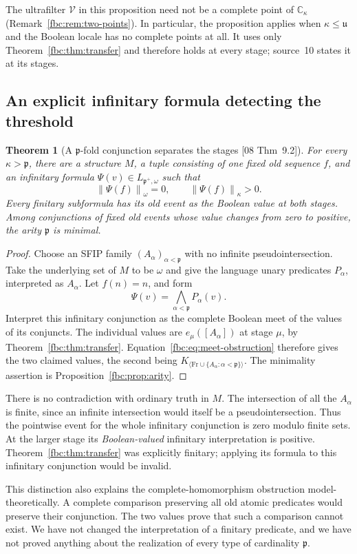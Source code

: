 \documentclass[11pt,letterpaper]{article}
\newtheorem{theorem}{Theorem}[section]
\theoremstyle{definition}
\theoremstyle{remark}
\newcommand{\om}{\omega}
\newcommand{\Fr}{\mathrm{Fr}}
\newcommand{\C}{\mathbb C}
\newcommand{\cp}{\mathfrak p}
\newcommand{\cu}{\mathfrak u}
\newcommand{\gen}[1]{\langle #1\rangle}
\newcommand{\cV}{\mathcal V}
\newcommand{\truth}[1]{\left\lVert #1\right\rVert}
\newcommand{\src}[1]{\textup{[#1]}}
\begin{document}
The ultrafilter $\cV$ in this proposition need not be a complete point of
$\C_\kappa$ (Remark~\ref{fbc:rem:two-points}). In particular, the
proposition applies when $\kappa\leq\cu$ and the Boolean locale has no
complete points at all. It uses only Theorem~\ref{fbc:thm:transfer} and
therefore holds at every stage; source~10 states it at its stages.

\subsection{An explicit infinitary formula detecting the threshold}
\begin{theorem}[A $\cp$-fold conjunction separates the stages \src{08 Thm~9.2}]
\label{fbc:thm:infinitary}
For every $\kappa>\cp$, there are a structure $M$, a tuple consisting
of one fixed old sequence $f$, and an infinitary formula
$\Psi(v)\in L_{\cp^+,\om}$ such that
\[
 \truth{\Psi(f)}_\om=0,
 \qquad
 \truth{\Psi(f)}_\kappa>0.
\]
Every finitary subformula has its old event as the Boolean value
at both stages. Among conjunctions of fixed old events whose value
changes from zero to positive, the arity $\cp$ is minimal.
\end{theorem}
\begin{proof}
Choose an SFIP family $(A_\alpha)_{\alpha<\cp}$ with no infinite
pseudointersection. Take the underlying set of $M$ to be $\om$
and give the language unary predicates $P_\alpha$, interpreted as
$A_\alpha$. Let $f(n)=n$, and form
\[
 \Psi(v)=\bigwedge_{\alpha<\cp}P_\alpha(v).
\]
Interpret this infinitary conjunction as the complete Boolean meet
of the values of its conjuncts. The individual values are
$e_\mu([A_\alpha])$ at stage $\mu$, by
Theorem~\ref{fbc:thm:transfer}. Equation~\eqref{fbc:eq:meet-obstruction}
therefore gives the two claimed values, the second being
$K_{\gen{\Fr\cup\{A_\alpha:\alpha<\cp\}}}$.
The minimality assertion is Proposition~\ref{fbc:prop:arity}.
\end{proof}

There is no contradiction with ordinary truth in $M$. The
intersection of all the $A_\alpha$ is finite, since an infinite
intersection would itself be a pseudointersection. Thus the
pointwise event for the whole infinitary conjunction is zero
modulo finite sets. At the larger stage its \emph{Boolean-valued}
infinitary interpretation is positive. Theorem~\ref{fbc:thm:transfer}
was explicitly finitary; applying its formula to this infinitary
conjunction would be invalid.

This distinction also explains the complete-homomorphism obstruction
model-theoretically. A complete comparison preserving all old atomic
predicates would preserve their conjunction. The two values prove
that such a comparison cannot exist. We have not changed the
interpretation of a finitary predicate, and we have not proved
anything about the realization of every type of cardinality $\cp$.
\end{document}
